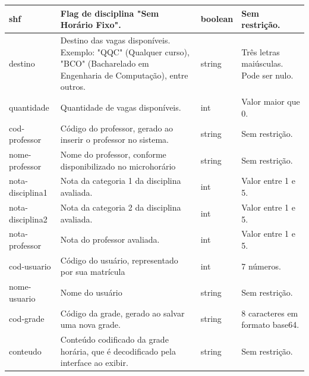 \begin{longtable}{ | >{\raggedright}m{} | >{\raggedright}m{} | >{\raggedright}m{} | >{\raggedright}m{} | }
    shf & Flag de disciplina "Sem Horário Fixo". & boolean & Sem restrição.\tabularnewline\hline
    destino & Destino das vagas disponíveis. Exemplo: "QQC" (Qualquer curso), "BCO" (Bacharelado em Engenharia de Computação), entre outros. & string & Três letras maiúsculas. Pode ser nulo.\tabularnewline\hline
    quantidade & Quantidade de vagas disponíveis. & int & Valor maior que 0.\tabularnewline\hline

    cod-professor & Código do professor, gerado ao inserir o professor no sistema. & string & Sem restrição.\tabularnewline\hline
    nome-professor & Nome do professor, conforme disponibilizado no microhorário & string & Sem restrição.\tabularnewline\hline

    nota-disciplina1 & Nota da categoria 1 da disciplina avaliada. & int & Valor entre 1 e 5.\tabularnewline\hline
    nota-disciplina2 & Nota da categoria 2 da disciplina avaliada. & int & Valor entre 1 e 5.\tabularnewline\hline
    nota-professor & Nota do professor avaliada. & int & Valor entre 1 e 5.\tabularnewline\hline

    cod-usuario & Código do usuário, representado por sua matrícula & int & 7 números.\tabularnewline\hline
    nome-usuario & Nome do usuário & string & Sem restrição.\tabularnewline\hline

    cod-grade & Código da grade, gerado ao salvar uma nova grade. & string & 8 caracteres em formato base64.\tabularnewline\hline
    conteudo & Conteúdo codificado da grade horária, que é decodificado pela interface ao exibir. & string & Sem restrição.

    \label{tab:dicionario-dados}
\end{longtable}
